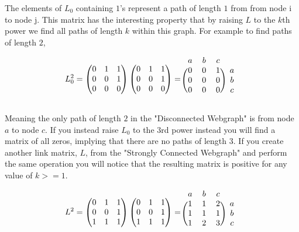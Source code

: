 \documentclass[12pt]{article}
\begin{document}
The elements of $L_0$ containing $1$'s represent a path of length $1$ from from node i to node j. This matrix has the interesting property that by raising $L$ to the $k$th power we find all paths of length $k$ within this graph. For example to find paths of length $2$,

\[
L_0^2 =
\begin{pmatrix}
  0 & 1 & 1 \\
  0 & 0 & 1 \\
  0 & 0 & 0 \\
\end{pmatrix}
%
\begin{pmatrix}
  0 & 1 & 1 \\
  0 & 0 & 1 \\
  0 & 0 & 0 \\
\end{pmatrix}
%
=
%
\begin{blockarray}{cccc}
a & b & c \\
\begin{block}{(ccc)c}
  0 & 0 & 1 & a \\
  0 & 0 & 0 & b \\
  0 & 0 & 0 & c \\
\end{block}
\end{blockarray}
\]

Meaning the only path of length $2$ in the "Disconnected Webgraph" is from node $a$ to node $c$. If you instead raise $L_0$ to the $3$rd power instead you will find a matrix of all zeros, implying that there are no paths of length $3$. If you create another link matrix, $L$, from the "Strongly Connected Webgraph" and perform the same operation you will notice that the resulting matrix is positive for any value of $k >= 1$.

\[
L^2 =
\begin{pmatrix}
  0 & 1 & 1 \\
  0 & 0 & 1 \\
  1 & 1 & 1 \\
\end{pmatrix}
%
\begin{pmatrix}
  0 & 1 & 1 \\
  0 & 0 & 1 \\
  1 & 1 & 1 \\
\end{pmatrix}
%
=
%
\begin{blockarray}{cccc}
a & b & c \\
\begin{block}{(ccc)c}
  1 & 1 & 2 & a \\
  1 & 1 & 1 & b \\
  1 & 2 & 3 & c \\
\end{block}
\end{blockarray}
\]
\end{document}
